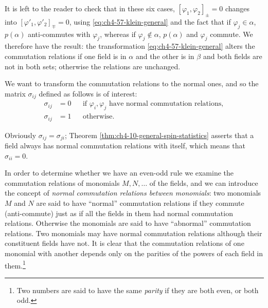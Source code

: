 It is left to the reader to check that in these six cases,
$[\varphi_1,\varphi_2]_\pm=0$ changes into
$[\varphi'_1,\varphi'_2]_\mp=0$, using \eqref{eq:ch4-57-klein-general} and the fact that if
$\varphi_j\in\alpha$, $p(\alpha)$ anti-commutes with $\varphi_j$, whereas if
$\varphi_j\notin\alpha$, $p(\alpha)$ and $\varphi_j$ commute.  We therefore
have the result: the transformation \eqref{eq:ch4-57-klein-general} alters the commutation relations
if one field is in $\alpha$ and the other is in $\beta$ and both fields are
not in both sets; otherwise the relations are unchanged.

We want to transform the commutation relations to the normal ones, and so the
matrix $\sigma_{ij}$ defined as follows is of interest:
\begin{equation}
\begin{aligned}
  \sigma_{ij}&=0 &&\text{if }\varphi_i,\varphi_j\text{ have normal commutation relations},\\
  \sigma_{ij}&=1 &&\text{otherwise.}
\end{aligned}
  \tag{4-58}\label{eq:ch4-58-sigma-definition}
\end{equation}

Obviously $\sigma_{ij}=\sigma_{ji}$; Theorem \ref{thm:ch4-10-general-spin-statistics} asserts that a field always
has normal commutation relations with itself, which means that $\sigma_{ii}=0$.

In order to determine whether we have an even-odd rule we examine the
commutation relations of monomials $M,N,\ldots$ of the fields, and we can
introduce the concept of \emph{normal commutation relations between
monomials}: two monomials $M$ and $N$ are said to have “normal” commutation
relations if they commute (anti-commute) just as if all the fields in them had
normal commutation relations.  Otherwise the monomials are said to have
“abnormal” commutation relations.  Two monomials may have normal commutation
relations although their constituent fields have not.  It is clear that the
commutation relations of one monomial with another depends only on the
parities of the powers of each field in them.\footnote{%
Two numbers are said to have the same \emph{parity} if they are both even,
or both odd.}

